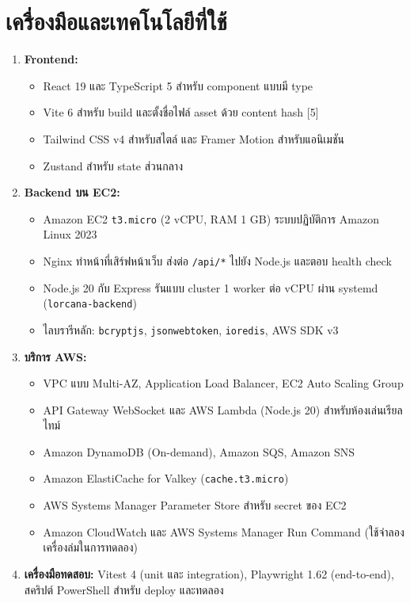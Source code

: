 \section{เครื่องมือและเทคโนโลยีที่ใช้}

\begin{enumerate}
    \item \textbf{Frontend:}
    \begin{itemize}
        \item React 19 และ TypeScript 5 สำหรับ component แบบมี type
        \item Vite 6 สำหรับ build และตั้งชื่อไฟล์ asset ด้วย content hash [5]
        \item Tailwind CSS v4 สำหรับสไตล์ และ Framer Motion สำหรับแอนิเมชัน
        \item Zustand สำหรับ state ส่วนกลาง
    \end{itemize}
    \item \textbf{Backend บน EC2:}
    \begin{itemize}
        \item Amazon EC2 \texttt{t3.micro} (2 vCPU, RAM 1 GB) ระบบปฏิบัติการ Amazon Linux 2023
        \item Nginx ทำหน้าที่เสิร์ฟหน้าเว็บ ส่งต่อ \texttt{/api/*} ไปยัง Node.js และตอบ health check
        \item Node.js 20 กับ Express รันแบบ cluster 1 worker ต่อ vCPU ผ่าน systemd (\texttt{lorcana-backend})
        \item ไลบรารีหลัก: \texttt{bcryptjs}, \texttt{jsonwebtoken}, \texttt{ioredis}, AWS SDK v3
    \end{itemize}
    \item \textbf{บริการ AWS:}
    \begin{itemize}
        \item VPC แบบ Multi-AZ, Application Load Balancer, EC2 Auto Scaling Group
        \item API Gateway WebSocket และ AWS Lambda (Node.js 20) สำหรับห้องเล่นเรียลไทม์
        \item Amazon DynamoDB (On-demand), Amazon SQS, Amazon SNS
        \item Amazon ElastiCache for Valkey (\texttt{cache.t3.micro})
        \item AWS Systems Manager Parameter Store สำหรับ secret ของ EC2
        \item Amazon CloudWatch และ AWS Systems Manager Run Command (ใช้จำลองเครื่องล่มในการทดลอง)
    \end{itemize}
    \item \textbf{เครื่องมือทดสอบ:} Vitest 4 (unit และ integration), Playwright 1.62 (end-to-end), สคริปต์ PowerShell สำหรับ deploy และทดลอง
\end{enumerate}

